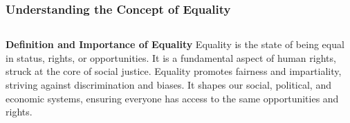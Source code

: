 \documentclass[5pt]{beamer}
\begin{document}
\begin{frame}
\frametitle{Understanding the Concept of Equality}
\begin{columns}
\begin{column}{0.7\textwidth}
\begin{block}{\textbf{Definition and Importance of Equality}}
Equality is the state of being equal in status, rights, or opportunities. It is a fundamental aspect of human rights, struck at the core of social justice. Equality promotes fairness and impartiality, striving against discrimination and biases. It shapes our social, political, and economic systems, ensuring everyone has access to the same opportunities and rights.
\end{block}
\end{column}
\end{columns}
\end{frame}
\end{document}

